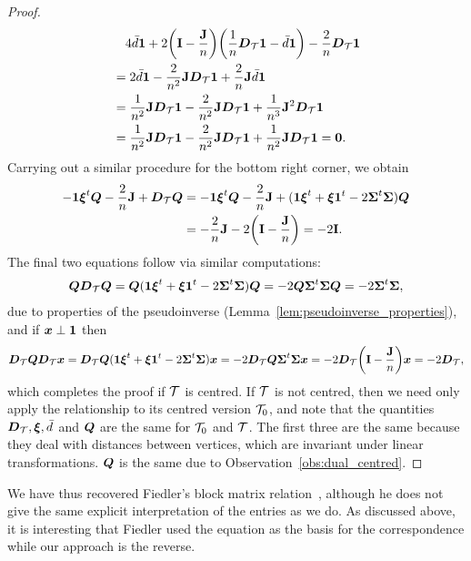 \begin{proof}
\begin{align*}
	&\quad  4\bar{d}\vb{1} +2\bigg(\vb{I}-\frac{\vb{J}}{n}\bigg)\bigg(\frac{1}{n}\vb*{D}_{\mathcal{T}}\vb{1}-\bar{d}\vb{1}\bigg)  -\frac{2}{n}\vb*{D}_{\mathcal{T}}\vb{1} \\
	&= 2\bar{d}\vb{1} -  \frac{2}{n^2}\vb{J}\vb*{D}_{\mathcal{T}}\vb{1} + \frac{2}{n}\vb{J}\bar{d}\vb{1} \\
	&=\frac{1}{n^2}\vb{J}\vb*{D}_{\mathcal{T}}\vb{1} -  \frac{2}{n^2}\vb{J}\vb*{D}_{\mathcal{T}}\vb{1} + \frac{1}{n^3}\vb{J}^2\vb*{D}_{\mathcal{T}}\vb{1} \\
	&= \frac{1}{n^2}\vb{J}\vb*{D}_{\mathcal{T}}\vb{1} -  \frac{2}{n^2}\vb{J}\vb*{D}_{\mathcal{T}}\vb{1} + \frac{1}{n^2}\vb{J}\vb*{D}_{\mathcal{T}}\vb{1}=\vb{0}.
	\end{align*}
	Carrying out a similar  procedure for  the  bottom right corner, we  obtain  
	\begin{align*}
	-\vb{1}\vb*{\xi}^t\vb*{Q}-\frac{2}{n}\vb{J}+\vb*{D}_{\mathcal{T}}\vb*{Q} &= -\vb{1}\vb*{\xi}^t\vb*{Q}-\frac{2}{n}\vb{J}  + (\vb{1}\vb*{\xi}^t+\vb*{\xi}\vb{1}^t -2\boldsymbol{\Sigma}^t\boldsymbol{\Sigma})\vb*{Q} \\
	&= -\frac{2}{n}\vb{J}-2\bigg(\vb{I}-\frac{\vb{J}}{n}\bigg) = -2\vb{I}.
	\end{align*}
	The  final two equations follow via similar computations: 
	\begin{align*}
	\vb*{Q}\vb*{D}_{\mathcal{T}}\vb*{Q} = \vb*{Q}(\vb{1}\vb*{\xi}^t+\vb*{\xi}\vb{1}^t-2\boldsymbol{\Sigma}^t\boldsymbol{\Sigma})\vb*{Q} = -2\vb*{Q}\boldsymbol{\Sigma}^t\boldsymbol{\Sigma}\vb*{Q} = -2\boldsymbol{\Sigma}^t\boldsymbol{\Sigma},
	\end{align*}
	due to properties of the pseudoinverse (Lemma~\ref{lem:pseudoinverse_properties}), and if $\vb*{x}\perp\vb{1}$ then 
	\begin{align*}
	\vb*{D}_{\mathcal{T}} \vb*{Q}\vb*{D}_{\mathcal{T}} \vb*{x} = \vb*{D}_{\mathcal{T}} \vb*{Q}(\vb{1}\vb*{\xi}^t  +\vb*{\xi}\vb{1}^t - 2\boldsymbol{\Sigma}^t\boldsymbol{\Sigma})\vb*{x} = -2\vb*{D}_{\mathcal{T}}\vb*{Q} \boldsymbol{\Sigma}^t\boldsymbol{\Sigma}\vb*{x} = -2\vb*{D}_{\mathcal{T}}\bigg(\vb{I}-\frac{\vb{J}}{n}\bigg) \vb*{x} = -2\vb*{D}_{\mathcal{T}},
	\end{align*}
	which completes the proof if $\mathcal{T}$ is centred. If $\mathcal{T}$  is not centred, then we need only apply the relationship to its centred  version $\mathcal{T}_0$, and note  that the quantities $\vb*{D}_{\mathcal{T}}, \vb*{\xi},\bar{d}$ and $\vb*{Q}$ are the same for $\mathcal{T}_0$ and $\mathcal{T}$. The first three are the same because they deal with distances between vertices, which are invariant under linear transformations. $\vb*{Q}$ is the  same due to  Observation~\ref{obs:dual_centred}. 
\end{proof}

\begin{remark}
	We have thus recovered Fiedler's block matrix relation~\cite{fiedler1993geometric}, although he does not give the same explicit   interpretation of  the entries as we do. As discussed above, it is interesting that Fiedler used the equation  as the basis for the correspondence while our approach is the reverse. 
\end{remark}

